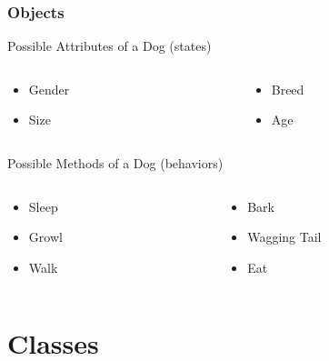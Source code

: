 \documentclass[10pt, compress]{beamer}
\begin{document}
\begin{frame}[fragile]
	\frametitle{Objects}
	\begin{block}{Possible Attributes of a Dog (states)}
		\begin{columns}
			\begin{column}{0.5\textwidth}
				\begin{itemize}
					\item[] Gender
					\item[] Size
				\end{itemize}
			\end{column}
			\begin{column}{0.5\textwidth}
				\begin{itemize}
					\item[] Breed
					\item[] Age
				\end{itemize}
			\end{column}
		\end{columns}
	\end{block}
	\begin{block}{Possible Methods of a Dog (behaviors)}
		\begin{columns}
			\begin{column}{0.5\textwidth}
				\begin{itemize}
					\item[] Sleep
					\item[] Growl
					\item[] Walk
				\end{itemize}
			\end{column}
			\begin{column}{0.5\textwidth}
				\begin{itemize}
					\item[] Bark
					\item[] Wagging Tail
					\item[] Eat
				\end{itemize}
			\end{column}
		\end{columns}
	\end{block}
\end{frame}

\section{Classes}
\end{document}
